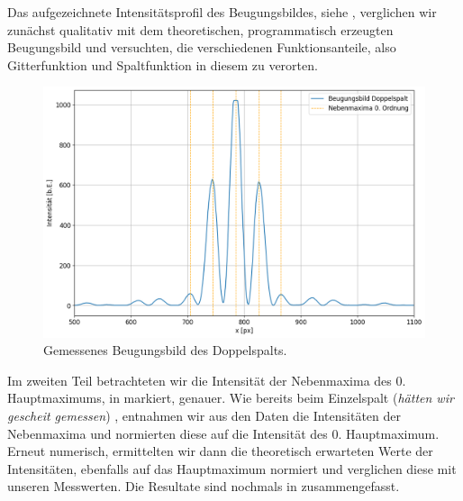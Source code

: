 Das aufgezeichnete Intensitätsprofil des Beugungsbildes, siehe , verglichen wir zunächst qualitativ mit dem theoretischen, programmatisch erzeugten Beugungsbild und versuchten, die verschiedenen Funktionsanteile, also Gitterfunktion und Spaltfunktion in diesem zu verorten.

\begin{figure}[H]
  \centering
  \includegraphics[width=.9\textwidth]{files/plots/3/ds_gemessen_beugungsbild.png}
  \caption{Gemessenes Beugungsbild des Doppelspalts.}
  \label{fig:ds_gemessen_beugungsbild_zsmf}
\end{figure}

Im zweiten Teil betrachteten wir die Intensität der Nebenmaxima des 0. Hauptmaximums, in  markiert, genauer. Wie bereits beim Einzelspalt (\textit{hätten wir gescheit gemessen}) , entnahmen wir aus den Daten die Intensitäten der Nebenmaxima und normierten diese auf die Intensität des 0. Hauptmaximum. Erneut numerisch, ermittelten wir dann die theoretisch erwarteten Werte der Intensitäten, ebenfalls auf das Hauptmaximum normiert und verglichen diese mit unseren Messwerten. Die Resultate sind nochmals in  zusammengefasst.

